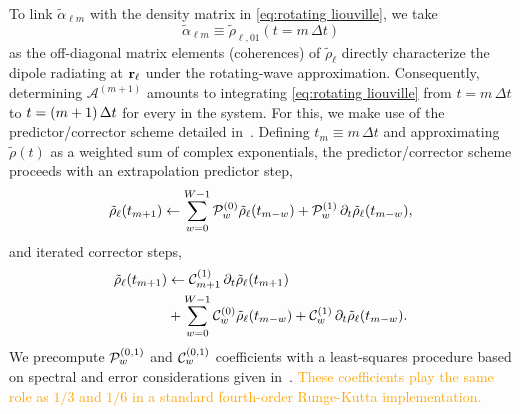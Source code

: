 To link $\tilde{\alpha}_{\ell m}$ with the density matrix in \cref{eq:rotating liouville}, we take
\begin{equation}
  \tilde{\alpha}_{\ell m} \equiv \tilde{\rho}_{\ell, 01}(t = m \, \Delta t)
  \label{eq:polarization definition}
\end{equation}
as the off-diagonal matrix elements (coherences) of $\tilde{\rho}_{\ell}$ directly characterize the dipole radiating at $\vb{r}_\ell$ under the rotating-wave approximation.
Consequently, determining $\mathcal{A}^{(m + 1)}$ amounts to integrating \cref{eq:rotating liouville} from $t = m \, \Delta t$ to $t = \qty(m + 1) \, \Delta t$ for every \qd{} in the system.
For this, we make use of the predictor/corrector scheme detailed in~\cite{Glaser2009}.
Defining $t_m \equiv m \, \Delta t$ and approximating $\tilde{\rho}(t)$ as a weighted sum of complex exponentials, the predictor/corrector scheme proceeds with an extrapolation predictor step,
\begin{equation}
  \tilde{\rho}_\ell(t_{m + 1}) \leftarrow \sum_{w = 0}^{W-1} \mathcal{P}_w^{\qty(0)} \tilde{\rho}_\ell(t_{m-w}) + \mathcal{P}_w^{\qty(1)} \, \partial_t \tilde{\rho}_\ell(t_{m-w}),
  \label{eq:predictor}
\end{equation}
and iterated corrector steps,
\begin{equation}
  \begin{aligned}
    \tilde{\rho}_\ell(t_{m + 1}) &\leftarrow \mathcal{C}_{m+1}^{\qty(1)} \, \partial_t \tilde{\rho}_\ell(t_{m+1}) \\
                                 &+ \sum_{w = 0}^{W - 1} \mathcal{C}_w^{\qty(0)} \tilde{\rho}_\ell(t_{m-w}) + \mathcal{C}_w^{\qty(1)} \, \partial_t \tilde{\rho}_\ell(t_{m-w}).
  \end{aligned}
  \label{eq:corrector}
\end{equation}
We precompute $\mathcal{P}_w^{\qty(0, 1)}$ and $\mathcal{C}_w^{\qty(0, 1)}$ coefficients with a least-squares procedure based on spectral and error considerations given in~\cite{Glaser2009}.
\textcolor{orange}{These coefficients play the same role as $1/3$ and $1/6$ in a standard fourth-order Runge-Kutta implementation.}

